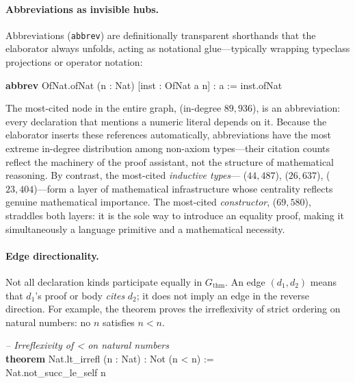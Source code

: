 \paragraph{Abbreviations as invisible hubs.}
Abbreviations (\texttt{abbrev}) are definitionally transparent shorthands that the elaborator always unfolds, acting as notational glue---typically wrapping typeclass projections or operator notation:

\begin{codebox}
\textbf{abbrev} \textcolor{red!70!black}{OfNat.ofNat} (n : Nat) [inst : OfNat a n] : a := inst.ofNat
\end{codebox}

\noindent
The most-cited node in the entire graph,  (in-degree $89{,}936$), is an abbreviation: every declaration that mentions a numeric literal depends on it. Because the elaborator inserts these references automatically, abbreviations have the most extreme in-degree distribution among non-axiom types---their citation counts reflect the machinery of the proof assistant, not the structure of mathematical reasoning. By contrast, the most-cited \emph{inductive types}--- ($44{,}487$),  ($26{,}637$),  ($23{,}404$)---form a layer of mathematical infrastructure whose centrality reflects genuine mathematical importance. The most-cited \emph{constructor},  ($69{,}580$), straddles both layers: it is the sole way to introduce an equality proof, making it simultaneously a language primitive and a mathematical necessity.

\paragraph{Edge directionality.}
Not all declaration kinds participate equally in $G_{\mathrm{thm}}$. An edge $(d_1, d_2)$ means that $d_1$'s proof or body \emph{cites} $d_2$; it does not imply an edge in the reverse direction. For example, the theorem  proves the irreflexivity of strict ordering on natural numbers: no $n$ satisfies $n < n$.

\begin{codebox}
\textit{\color{gray}-- Irreflexivity of < on natural numbers}\\
\textbf{theorem} \textcolor{red!70!black}{Nat.lt\_irrefl} (n : Nat) : Not (n < n) :=\\
\hspace{1.5em}\textcolor{red!70!black}{Nat.not\_succ\_le\_self} n
\end{codebox}

